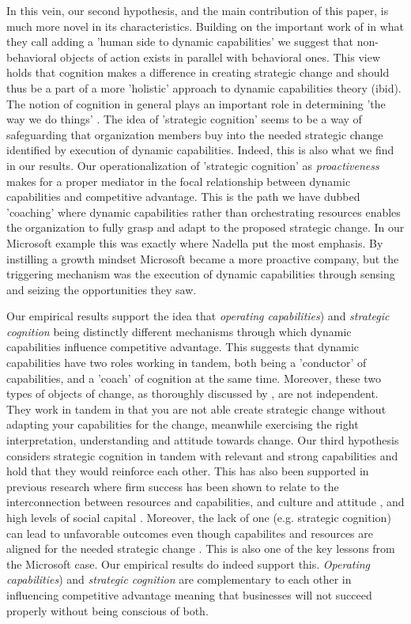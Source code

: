 \documentclass[review,fleqn]{elsarticle}\usepackage[]{graphicx}\usepackage[]{color}
\begin{document}
In this vein, our second hypothesis, and the main contribution of this paper, is much more
novel in its characteristics. Building on the important work of \cite{Verona2011} in what
they call adding a 'human side to dynamic capabilities' we suggest that non-behavioral
objects of action exists in parallel with behavioral ones. This view holds that cognition
makes a difference in creating strategic change and should thus be a part of a more
'holistic' approach to dynamic capabilities theory (ibid). The notion of cognition in
general plays an important role in determining 'the way we do things'
\citep{Vince2011}. The idea of 'strategic cognition' seems to be a way of safeguarding
that organization members buy into the needed strategic change identified by execution of
dynamic capabilities. Indeed, this is also what we find in our results. Our
operationalization of 'strategic cognition' as \emph{proactiveness} makes for a proper
mediator in the focal relationship between dynamic capabilities and competitive
advantage. This is the path we have dubbed 'coaching' where dynamic capabilities rather
than orchestrating resources enables the organization to fully grasp and adapt to the
proposed strategic change. In our Microsoft example this was exactly where Nadella put the
most emphasis. By instilling a growth mindset Microsoft became a more proactive company,
but the triggering mechanism was the execution of dynamic capabilities through sensing and
seizing the opportunities they saw.

Our empirical results support the idea that \emph{operating capabilities}) and
\emph{strategic cognition} being distinctly different mechanisms through which dynamic
capabilities influence competitive advantage. This suggests that dynamic capabilities have
two roles working in tandem, both being a 'conductor' of capabilities, and a 'coach' of
cognition at the same time. Moreover, these two types of objects of change, as thoroughly
discussed by \cite{Verona2011}, are not independent. They work in tandem in that you are
not able create strategic change without adapting your capabilities for the change,
meanwhile exercising the right interpretation, understanding and attitude towards
change. Our third hypothesis considers strategic cognition in tandem with relevant and
strong capabilities and hold that they would reinforce each other. This has also been
supported in previous research where firm success has been shown to relate to the
interconnection between resources and capabilities, and culture and attitude
\citep{Verona2003}, and high levels of social capital \citep{Blyler2003}. Moreover, the
lack of one (e.g. strategic cognition) can lead to unfavorable outcomes even though
capabilites and resources are aligned for the needed strategic change
\citep{Tripsas2000}. This is also one of the key lessons from the Microsoft case. Our
empirical results do indeed support this. \emph{Operating capabilities}) and
\emph{strategic cognition} are complementary to each other in influencing competitive
advantage meaning that businesses will not succeed properly without being conscious of
both.
\end{document}
